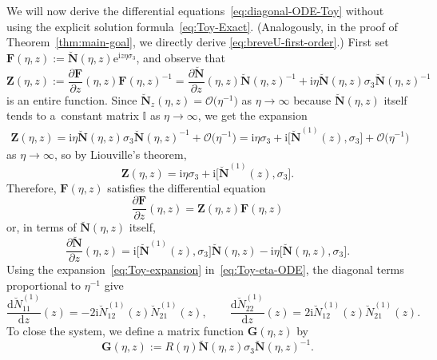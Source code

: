 \documentclass[pdftex]{sigma}
\numberwithin{equation}{section}
\begin{document}
We will now derive the differential equations~\eqref{eq:diagonal-ODE-Toy} without
using the explicit solution formula~\eqref{eq:Toy-Exact}.
(Analogously, in the proof of Theorem~\ref{thm:main-goal}, we directly derive
\eqref{eq:breveU-first-order}.)
First set $\mathbf{F}(\eta,z):=\breve{\mathbf{N}}(\eta,z)\mathrm{e}^{\mathrm{i}
z\eta\sigma_3}$, and observe that
\[
\mathbf{Z}(\eta,z):=\frac{\partial\mathbf{F}}{\partial z}(\eta,z)\mathbf{F}(\eta,z)^{-1}=\frac{\partial \breve{\mathbf{N}}}{\partial z}(\eta,z)\breve{\mathbf{N}}(\eta,z)^{-1}+\mathrm{i} \eta\breve{\mathbf{N}}(\eta,z)\sigma_3\breve{\mathbf{N}}(\eta,z)^{-1}
\]
is an entire function. Since $\breve{\mathbf{N}}_z(\eta,z)=\mathcal{O}\bigl(\eta^{-1}\bigr)$ as $\eta\to\infty$ because $\breve{\mathbf{N}}(\eta,z)$ itself tends to a~constant matrix $\mathbb{I}$ as $\eta\to\infty$, we get the expansion
\begin{align*}
\mathbf{Z}(\eta,z) =\mathrm{i} \eta\breve{\mathbf{N}}(\eta,z)\sigma_3\breve{\mathbf{N}}(\eta,z)^{-1}+\mathcal{O}\bigl(\eta^{-1}\bigr)
=\mathrm{i} \eta\sigma_3 +\mathrm{i} \big[\breve{\mathbf{N}}^{(1)}(z),\sigma_3\big] + \mathcal{O}\bigl(\eta^{-1}\bigr)
\end{align*}
as $\eta\to\infty$, so by Liouville's theorem,
\[
\mathbf{Z}(\eta,z)=\mathrm{i} \eta\sigma_3 +\mathrm{i} \big[\breve{\mathbf{N}}^{(1)}(z),\sigma_3\big].
\]
Therefore, $\mathbf{F}(\eta,z)$ satisfies the differential equation
\[
\frac{\partial\mathbf{F}}{\partial z}(\eta,z)=\mathbf{Z}(\eta,z)\mathbf{F}(\eta,z)
\]
or, in terms of $\breve{\mathbf{N}}(\eta,z)$ itself,
\begin{equation}
\frac{\partial\breve{\mathbf{N}}}{\partial z}(\eta,z)=\mathrm{i} \big[\breve{\mathbf{N}}^{(1)}(z),\sigma_3\big]\breve{\mathbf{N}}(\eta,z) -\mathrm{i}\eta\big[\breve{\mathbf{N}}(\eta,z),\sigma_3\big].
\label{eq:Toy-eta-ODE}
\end{equation}
Using the expansion~\eqref{eq:Toy-expansion} in~\eqref{eq:Toy-eta-ODE},
the diagonal terms proportional to $\eta^{-1}$ give
\begin{equation}
\frac{\mathrm{d}\breve{N}^{(1)}_{11}}{\mathrm{d} z}(z) = -2\mathrm{i}\breve{N}^{(1)}_{12}(z)\breve{N}^{(1)}_{21}(z),\qquad
\frac{\mathrm{d}\breve{N}^{(1)}_{22}}{\mathrm{d} z}(z) = 2\mathrm{i}\breve{N}^{(1)}_{12}(z)\breve{N}^{(1)}_{21}(z).
\label{eq:diagonal-ODE-pre-Toy}
\end{equation}
To close the system, we define a matrix function $\mathbf{G}(\eta,z)$ by
\begin{equation}
\mathbf{G}(\eta,z):=R(\eta)\breve{\mathbf{N}}(\eta,z)\sigma_3\breve{\mathbf{N}}(\eta,z)^{-1}.
\label{eq:Toy-G-def}
\end{equation}
\end{document}
